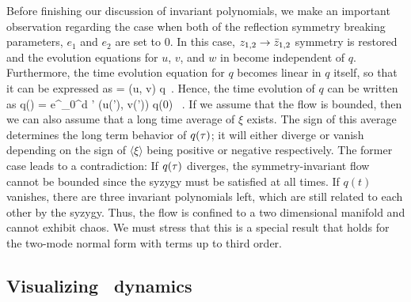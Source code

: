 \documentclass[aip,cha,
reprint,
secnumarabic,
nofootinbib, tightenlines,
nobibnotes, showkeys, showpacs,
superscriptaddress,
]{revtex4-1}
\begin{document}
Before finishing our discussion of invariant polynomials, we make an
important observation regarding the case when both of the reflection symmetry breaking
parameters, $e_{1}$ and $e_2$ are set to $0$. In this case, $z_{1,2} \rightarrow \bar{z}_{1,2}$
symmetry is restored and the evolution equations for $u$, $v$, and $w$ in  become
independent of $q$. Furthermore, the time evolution equation for $q$ becomes linear in $q$ itself, so that
it can be expressed as
\beq
     = \xi (u, v) q \,.
Hence, the time evolution of $q$ can be written as
\beq
    q(\zeit) =  e^{\int_0^\zeit d \zeit' \xi (u(\zeit'), v(\zeit'))} q(0) \, .
If we assume that the flow is bounded, then we can also assume that a long time
average of $\xi$ exists. The sign of this average determines the long term
behavior of $q(\tau)$; it will either diverge or vanish depending on the sign of
$\langle \xi \rangle$ being positive or negative respectively. The former case
leads to a contradiction: If $q(\tau)$ diverges, the symmetry-invariant flow cannot
be bounded since the syzygy  must be satisfied at all times. If
$q(t)$ vanishes, there are three invariant polynomials left, which are still
related to each other by the syzygy. Thus, the flow is confined
to a two dimensional manifold and cannot exhibit chaos.
We must stress that this is a special result that holds for the two-mode
normal form with terms up to third order.

\subsection{Visualizing \twomode\ dynamics}
\label{s:visual}
\end{document}
